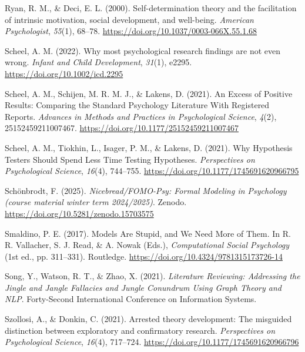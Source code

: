 \documentclass[man]{apa7}
\newlength{\cslhangindent}
\newenvironment{CSLReferences}[2] %
 {\begin{list}{}{%
  \setlength{\itemindent}{0pt}
  \setlength{\leftmargin}{0pt}
  \setlength{\parsep}{0pt}
  \ifodd #1
   \setlength{\leftmargin}{\cslhangindent}
   \setlength{\itemindent}{-1\cslhangindent}
  \fi
  \setlength{\itemsep}{#2\baselineskip}}}
 {\end{list}}
\begin{document}
\begin{CSLReferences}{1}{0}
Ryan, R. M., \& Deci, E. L. (2000). Self-determination theory and the facilitation of intrinsic motivation, social development, and well-being. \emph{American Psychologist}, \emph{55}(1), 68--78. \url{https://doi.org/10.1037/0003-066X.55.1.68}

Scheel, A. M. (2022). Why most psychological research findings are not even wrong. \emph{Infant and Child Development}, \emph{31}(1), e2295. \url{https://doi.org/10.1002/icd.2295}

Scheel, A. M., Schijen, M. R. M. J., \& Lakens, D. (2021). An {Excess} of {Positive Results}: {Comparing} the {Standard Psychology Literature With Registered Reports}. \emph{Advances in Methods and Practices in Psychological Science}, \emph{4}(2), 25152459211007467. \url{https://doi.org/10.1177/25152459211007467}

Scheel, A. M., Tiokhin, L., Isager, P. M., \& Lakens, D. (2021). Why {Hypothesis Testers Should Spend Less Time Testing Hypotheses}. \emph{Perspectives on Psychological Science}, \emph{16}(4), 744--755. \url{https://doi.org/10.1177/1745691620966795}

Schönbrodt, F. (2025). \emph{Nicebread/{FOMO-Psy}: {Formal Modeling} in {Psychology} (course material winter term 2024/2025)}. Zenodo. \url{https://doi.org/10.5281/zenodo.15703575}

Smaldino, P. E. (2017). Models {Are Stupid}, and {We Need More} of {Them}. In R. R. Vallacher, S. J. Read, \& A. Nowak (Eds.), \emph{Computational {Social Psychology}} (1st ed., pp. 311--331). Routledge. \url{https://doi.org/10.4324/9781315173726-14}

Song, Y., Watson, R. T., \& Zhao, X. (2021). \emph{Literature {Reviewing}: {Addressing} the {Jingle} and {Jangle Fallacies} and {Jungle Conundrum Using Graph Theory} and {NLP}}. Forty-{Second International Conference} on {Information Systems}.

Szollosi, A., \& Donkin, C. (2021). Arrested theory development: {The} misguided distinction between exploratory and confirmatory research. \emph{Perspectives on Psychological Science}, \emph{16}(4), 717--724. \url{https://doi.org/10.1177/1745691620966796}


\end{CSLReferences}
\end{document}
